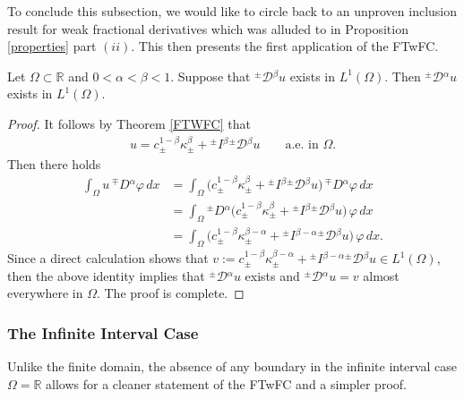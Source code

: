 \documentclass[leqno,final]{siamltex}
\numberwithin{equation}{section}
\newcommand{\Ome}{{\Omega}}
\renewcommand{\(}{\bigl(}
\renewcommand{\)}{\bigr)}
\newcommand{\R}{\mathbb{R}}
\begin{document}
    To conclude this subsection,  we would like to circle back to an unproven 
    inclusion result for weak fractional derivatives which was alluded to in 
    Proposition \ref{properties} part $(ii)$. This then presents the first application of the FTwFC. 
   
   \begin{proposition}
       Let $\Omega \subset \R$ and $0 < \alpha < \beta <1$. Suppose that ${^{\pm}}{\mathcal{D}}{^{\beta}}u$ exists in $L^{1}(\Omega)$. Then ${^{\pm}}{\mathcal{D}}{^{\alpha}}u$ exists in $L^{1}(\Omega)$.
   \end{proposition}
   
   \begin{proof}
        It follows by Theorem \ref{FTWFC} that 
        \begin{align*}
            u = c^{1-\beta}_{\pm} \kappa^{\beta}_{\pm} + {^{\pm}}{I}{^{\beta}} {^{\pm}}{\mathcal{D}}{^{\beta}} u \qquad\mbox{a.e. in } \Omega.
        \end{align*}
         Then there holds   
        \begin{align*}
            \int_{\Omega} u\, {^{\mp}}{D}{^{\alpha}} \varphi\,dx 
            &= \int_{\Omega} \bigl(c^{1-\beta}_{\pm} \kappa^{\beta}_{\pm} + {^{\pm}}{I}{^{\beta}} {^{\pm}}{\mathcal{D}}{^{\beta}} u \bigr)\,{^{\mp}}{D}{^{\alpha}} \varphi\,dx \\
            &= \int_{\Omega} {^{\pm}}{D}{^{\alpha}} \bigl(c^{1-\beta}_{\pm} \kappa^{\beta}_{\pm} + {^{\pm}}{I}{^{\beta}} {^{\pm}}{\mathcal{D}}{^{\beta}} u \bigr)\,\varphi\,dx \\ 
            &= \int_{\Omega} \bigl(c^{1-\beta}_{\pm} \kappa^{\beta -\alpha}_{\pm} + {^{\pm}}{I}{^{\beta -\alpha}} {^{\pm}}{\mathcal{D}}{^{\beta}} u \bigr)\, \varphi\,dx. 
        \end{align*}
        Since a direct calculation shows that $v:=c^{1-\beta}_{\pm} \kappa^{\beta -\alpha}_{\pm} + {^{\pm}}{I}{^{\beta -\alpha}} {^{\pm}}{\mathcal{D}}{^{\beta}} u\in L^1(\Omega)$,
        then the above identity implies that ${^{\pm}}{\mathcal{D}}{^{\alpha}}u$ exists and 
        ${^{\pm}}{\mathcal{D}}{^{\alpha}}u=v$ almost everywhere in $\Omega$. The proof is complete.
   \end{proof}
   
\subsubsection{\bf The Infinite Interval Case}\label{sec-4.6.2}
Unlike the finite domain, the absence of any boundary in the infinite interval case 
$\Ome=\R$ allows for a cleaner statement of the FTwFC and a simpler proof.
\end{document}
